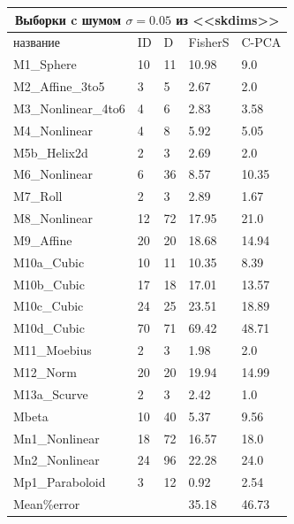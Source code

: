 \documentclass[english, russian]{sobraep}
\begin{document}
\begin{tabular}{
p{2.4cm}|p{0.9cm}|p{0.9cm}|p{0.9cm}|p{0.9cm}  }
 \multicolumn{5}{c}{Выборки c шумом $\sigma = 0.05$ из <<skdims>>} \\
 \hline
 название & ID & D & FisherS& C-PCA\\
 \hline
 M1_Sphere   & 10 & 11 & 10.98 & 9.0\\
M2_Affine_3to5   & 3 & 5 & 2.67 & 2.0\\
M3_Nonlinear_4to6   & 4 & 6 & 2.83 & 3.58\\
M4_Nonlinear   & 4 & 8 & 5.92 & 5.05\\
M5b_Helix2d   & 2 & 3 & 2.69 & 2.0\\
M6_Nonlinear   & 6 & 36 & 8.57 & 10.35\\
M7_Roll   & 2 & 3 & 2.89 & 1.67\\
M8_Nonlinear   & 12 & 72 & 17.95 & 21.0\\
M9_Affine   & 20 & 20 & 18.68 & 14.94\\
M10a_Cubic   & 10 & 11 & 10.35 & 8.39\\
M10b_Cubic   & 17 & 18 & 17.01 & 13.57\\
M10c_Cubic   & 24 & 25 & 23.51 & 18.89\\
M10d_Cubic   & 70 & 71 & 69.42 & 48.71\\
M11_Moebius   & 2 & 3 & 1.98 & 2.0\\
M12_Norm   & 20 & 20 & 19.94 & 14.99\\
M13a_Scurve   & 2 & 3 & 2.42 & 1.0\\
Mbeta   & 10 & 40 & 5.37 & 9.56\\
Mn1_Nonlinear   & 18 & 72 & 16.57 & 18.0\\
Mn2_Nonlinear   & 24 & 96 & 22.28 & 24.0\\
Mp1_Paraboloid   & 3 & 12 & 0.92 & 2.54\\
\hline
Mean\%error & & & 35.18 & 46.73\\
 \hline

\end{tabular}
\end{document}
